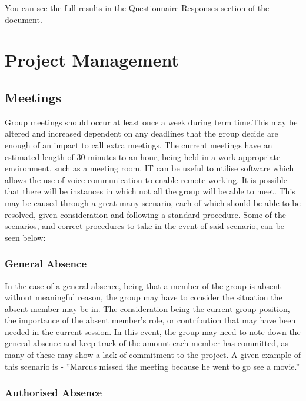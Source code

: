 \documentclass[
  english,
  a4paper,
,tablecaptionabove
]{scrartcl}
\begin{document}
You can see the full results in the
\protect\hyperlink{questionnaire-responses}{Questionnaire Responses}
section of the document.

\newpage

\hypertarget{project-management}{%
\section{Project Management}\label{project-management}}

\hypertarget{meetings}{%
\subsection{Meetings}\label{meetings}}

Group meetings should occur at least once a week during term time.This
may be altered and increased dependent on any deadlines that the group
decide are enough of an impact to call extra meetings. The current
meetings have an estimated length of 30 minutes to an hour, being held
in a work-appropriate environment, such as a meeting room. IT can be
useful to utilise software which allows the use of voice communication
to enable remote working. It is possible that there will be instances in
which not all the group will be able to meet. This may be caused through
a great many scenario, each of which should be able to be resolved,
given consideration and following a standard procedure. Some of the
scenarios, and correct procedures to take in the event of said scenario,
can be seen below:

\hypertarget{general-absence}{%
\subsubsection{General Absence}\label{general-absence}}

In the case of a general absence, being that a member of the group is
absent without meaningful reason, the group may have to consider the
situation the absent member may be in. The consideration being the
current group position, the importance of the absent member's role, or
contribution that may have been needed in the current session. In this
event, the group may need to note down the general absence and keep
track of the amount each member has committed, as many of these may show
a lack of commitment to the project. A given example of this scenario is
- ''Marcus missed the meeting because he went to go see a movie.''

\hypertarget{authorised-absence}{%
\subsubsection{Authorised Absence}\label{authorised-absence}}
\end{document}
